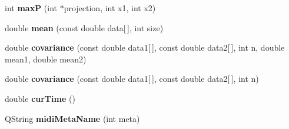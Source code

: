 \begin{DoxyCompactItemize}
\item 
\mbox{\label{namespace_ms_a1bfba462a3ccf35f6e91a4d6177ed329}} 
int {\bfseries maxP} (int $\ast$projection, int x1, int x2)
\item 
\mbox{\label{namespace_ms_a0cdd64f5e42bc67e0e9eb6d043c86260}} 
double {\bfseries mean} (const double data\mbox{[}$\,$\mbox{]}, int size)
\item 
\mbox{\label{namespace_ms_a081a8aa085b87d4f96bcfb6d641f81ee}} 
double {\bfseries covariance} (const double data1\mbox{[}$\,$\mbox{]}, const double data2\mbox{[}$\,$\mbox{]}, int n, double mean1, double mean2)
\item 
\mbox{\label{namespace_ms_a0c014e9dd38f32280302a51cd6c3bd0b}} 
double {\bfseries covariance} (const double data1\mbox{[}$\,$\mbox{]}, const double data2\mbox{[}$\,$\mbox{]}, int n)
\item 
\mbox{\label{namespace_ms_a2617a5fc8d319efe88fe3c3ca114af16}} 
double {\bfseries cur\+Time} ()
\item 
\mbox{\label{namespace_ms_a574a0b0078939bfae7aa128ecac9dae4}} 
Q\+String {\bfseries midi\+Meta\+Name} (int meta)
\end{DoxyCompactItemize}
